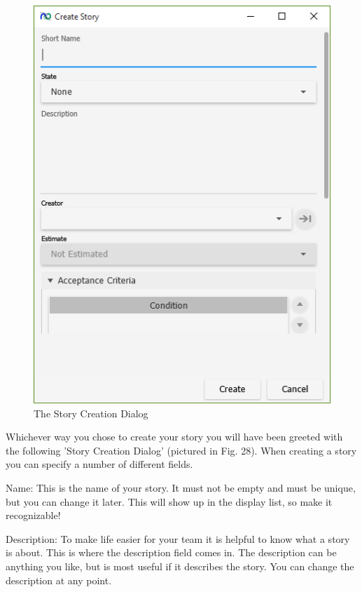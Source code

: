 \begin{figure}[H]
\centering
\includegraphics[width=\textwidth]{images/screenshots/stories2.PNG}
\caption{The Story Creation Dialog}
\label{fig:new_project}
\end{figure}

Whichever way you chose to create your story you will have been greeted with the following 'Story Creation Dialog' (pictured in Fig. 28). When creating a story you can specify a number of different fields. 

Name:
This is the name of your story. It must not be empty and must be unique, but you can change it later. This will show up in the display list, so make it recognizable!

Description:
To make life easier for your team it is helpful to know what a story is about. This is where the description field comes in. The description can be anything you like, but is most useful if it describes the story. You can change the description at any point.

